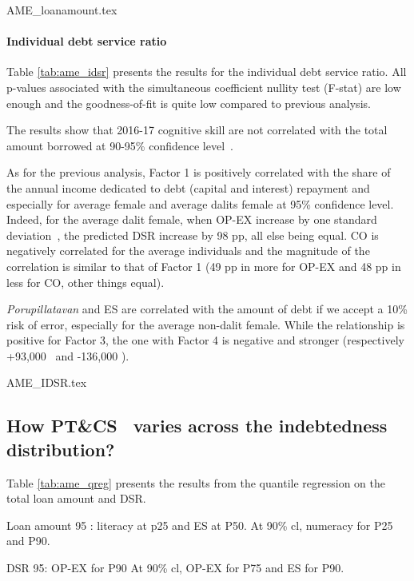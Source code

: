 \documentclass[a4paper, 11pt, onecolumn]{article}
\newcommand{\sd}{standard deviation}
\newcommand{\aebe}{all else being equal}
\newcommand{\ote}{other things equal}
\newcommand{\cl}{confidence level}
\newcommand{\PTCS}{PT\&CS}
\begin{document}
{AME_loanamount.tex}

\paragraph{Individual debt service ratio}
Table \ref{tab:ame_idsr} presents the results for the individual debt service ratio.
All p-values associated with the simultaneous coefficient nullity test (F-stat) are low enough and the goodness-of-fit is quite low compared to previous analysis.

The results show that 2016-17 cognitive skill are not correlated with the total amount borrowed at 90-95\% \cl~.

As for the previous analysis, Factor 1 is positively correlated with the share of the annual income dedicated to debt (capital and interest) repayment and especially for average female and average dalits female at 95\% \cl.
Indeed, for the average dalit female, when OP-EX increase by one \sd~, the predicted DSR increase by 98 pp, \aebe.
CO is negatively correlated for the average individuals and the magnitude of the correlation is similar to that of Factor 1 (49 pp in more for OP-EX and 48 pp in less for CO, \ote).

\textit{Porupillatavan} and ES are correlated with the amount of debt if we accept a 10\% risk of error, especially for the average non-dalit female.
While the relationship is positive for Factor 3, the one with Factor 4 is negative and stronger (respectively +93,000 \rupee~and -136,000 \rupee).

{AME_IDSR.tex}



\subsection{How \PTCS~ varies across the indebtedness distribution?}

Table \ref{tab:ame_qreg} presents the results from the quantile regression on the total loan amount and DSR.

Loan amount 95 : literacy at p25 and ES at P50.
At 90\% cl, numeracy for P25 and P90.

DSR 95: OP-EX for P90
At 90\% cl, OP-EX for P75 and ES for P90.
\end{document}
